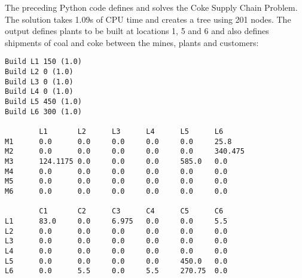 The preceding Python code defines and solves the Coke Supply Chain Problem. The solution takes 1.09s of CPU time and creates a tree using 201 nodes. The output defines plants to be built at locations 1, 5 and 6 and also defines shipments of coal and coke between the mines, plants and customers:
\begin{verbatim}
Build L1 150 (1.0)
Build L2 0 (1.0)
Build L3 0 (1.0)
Build L4 0 (1.0)
Build L5 450 (1.0)
Build L6 300 (1.0)

        L1       L2      L3      L4      L5      L6
M1      0.0      0.0     0.0     0.0     0.0     25.8
M2      0.0      0.0     0.0     0.0     0.0     340.475
M3      124.1175 0.0     0.0     0.0     585.0   0.0
M4      0.0      0.0     0.0     0.0     0.0     0.0
M5      0.0      0.0     0.0     0.0     0.0     0.0
M6      0.0      0.0     0.0     0.0     0.0     0.0

        C1       C2      C3      C4      C5      C6
L1      83.0     0.0     6.975   0.0     0.0     5.5
L2      0.0      0.0     0.0     0.0     0.0     0.0
L3      0.0      0.0     0.0     0.0     0.0     0.0
L4      0.0      0.0     0.0     0.0     0.0     0.0
L5      0.0      0.0     0.0     0.0     450.0   0.0
L6      0.0      5.5     0.0     5.5     270.75  0.0
\end{verbatim}
